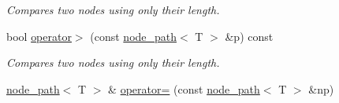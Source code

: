 \begin{DoxyCompactItemize}
\begin{DoxyCompactList}\small\item\em Compares two nodes using only their length. \end{DoxyCompactList}\item 
bool \hyperlink{classlgraph_1_1utils_1_1node__path_a50387915894923c9e999c157da6e4812}{operator$>$} (const \hyperlink{classlgraph_1_1utils_1_1node__path}{node\+\_\+path}$<$ T $>$ \&p) const \hypertarget{classlgraph_1_1utils_1_1node__path_a50387915894923c9e999c157da6e4812}{}\label{classlgraph_1_1utils_1_1node__path_a50387915894923c9e999c157da6e4812}

\begin{DoxyCompactList}\small\item\em Compares two nodes using only their length. \end{DoxyCompactList}\item 
\hyperlink{classlgraph_1_1utils_1_1node__path}{node\+\_\+path}$<$ T $>$ \& \hyperlink{classlgraph_1_1utils_1_1node__path_a394176d986b6f7c3f3f51978dde52172}{operator=} (const \hyperlink{classlgraph_1_1utils_1_1node__path}{node\+\_\+path}$<$ T $>$ \&np)\hypertarget{classlgraph_1_1utils_1_1node__path_a394176d986b6f7c3f3f51978dde52172}{}\label{classlgraph_1_1utils_1_1node__path_a394176d986b6f7c3f3f51978dde52172}


\end{DoxyCompactItemize}
